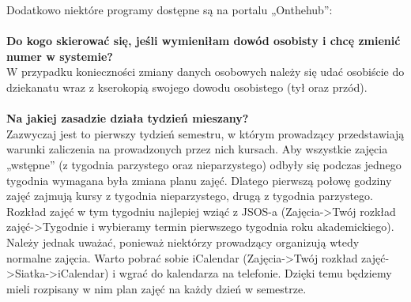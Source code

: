 \documentclass[11pt]{article}
\begin{document}
\indent Dodatkowo niektóre programy dostępne są na portalu „Onthehub”: 
{}\\\\
\textbf{Do kogo skierować się, jeśli wymieniłam dowód osobisty i chcę zmienić numer w systemie?} \\
\indent W przypadku konieczności zmiany danych osobowych należy się udać osobiście do dziekanatu wraz z kserokopią swojego dowodu osobistego (tył oraz przód). \\\\
\textbf{Na jakiej zasadzie działa tydzień mieszany?}\\
\indent Zazwyczaj jest to pierwszy tydzień semestru, w którym prowadzący przedstawiają warunki zaliczenia na prowadzonych przez nich kursach. Aby wszystkie zajęcia „wstępne” (z tygodnia parzystego oraz nieparzystego) odbyły się podczas jednego tygodnia wymagana była zmiana planu zajęć. Dlatego pierwszą połowę godziny zajęć zajmują kursy z tygodnia nieparzystego, drugą \linebreak z tygodnia parzystego. Rozkład zajęć w tym tygodniu najlepiej wziąć z JSOS-a \linebreak(Zajęcia->Twój rozkład zajęć->Tygodnie i wybieramy termin pierwszego tygodnia roku akademickiego). Należy jednak uważać, ponieważ niektórzy prowadzący organizują wtedy normalne zajęcia. Warto pobrać sobie iCalendar (Zajęcia->Twój rozkład zajęć->Siatka->iCalendar) i wgrać do kalendarza na telefonie. Dzięki temu będziemy mieli rozpisany w nim plan zajęć na każdy dzień w semestrze.  \\\\
\end{document}
